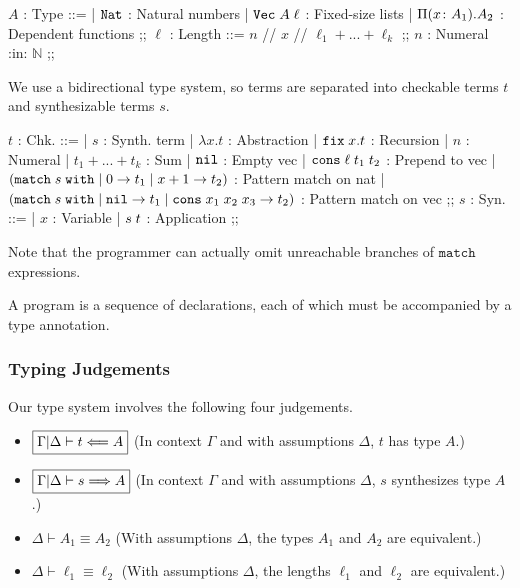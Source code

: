 \documentclass[acmsmall,nonacm]{acmart}
\begin{document}
\begin{center}
\begin{bnf}
    $A$ : Type ::=
        | $\texttt{Nat}$                 : Natural numbers
        | $\texttt{Vec} \; A \; \ell$   : Fixed-size lists
        | $\Pi (x \colon A_1) . A_2$ : Dependent functions
        ;;
    $\ell$ : Length ::= $n$ // $x$ // $\ell_1 + ... + \ell_k$
        ;;
    $n$ : Numeral :in: $\mathbb{N}$ ;;
\end{bnf}
\end{center}

\noindent
We use a bidirectional type system, so terms are separated into checkable terms $t$ and synthesizable terms $s$.

\begin{center}
\begin{bnf}
    $t$ : Chk. ::=
        | $s$ : Synth. term
        | $\lambda x . t$ : Abstraction
        | $\texttt{fix} \; x.t$ : Recursion
        | $n$ : Numeral
        | $t_1 + ... + t_k$ : Sum
        | $\texttt{nil}$ : Empty vec
        | $\texttt{cons} \; \ell \; t_1 \; t_2$ : Prepend to vec
        | $\left( \texttt{match} \; s \; \texttt{with} \; | \; 0 \rightarrow t_1 \; | \; x + 1 \rightarrow t_2 \right)$ : Pattern match on nat
        | $\left( \texttt{match} \; s \; \texttt{with} \; | \; \texttt{nil} \rightarrow t_1 \; | \; \texttt{cons} \; x_1 \; x_2 \; x_3 \rightarrow t_2 \right)$ : Pattern match on vec
        ;;
    $s$ : Syn. ::=
        | $x$ : Variable
        | $s \; t$  : Application
        ;;
\end{bnf}
\end{center}

\noindent
Note that the programmer can actually omit unreachable branches of $\texttt{match}$ expressions.

A program is a sequence of declarations, each of which must be accompanied by a type annotation.

\subsubsection{Typing Judgements}

Our type system involves the following four judgements.

\begin{itemize}
    \item $\boxed{\Gamma|\Delta \vdash t \Longleftarrow A}$ (In context $\Gamma$ and with assumptions $\Delta$, $t$ has type $A$.)
    \item $\boxed{\Gamma|\Delta \vdash s \Longrightarrow A}$ (In context $\Gamma$ and with assumptions $\Delta$, $s$ synthesizes type $A$.)
    \item $\boxed{\Delta \vdash A_1 \equiv A_2}$ (With assumptions $\Delta$, the types $A_1$ and $A_2$ are equivalent.)
    \item $\boxed{\Delta \vdash \ell_1 \equiv \ell_2}$ (With assumptions $\Delta$, the lengths $\ell_1$ and $\ell_2$ are equivalent.)
\end{itemize}
\end{document}
